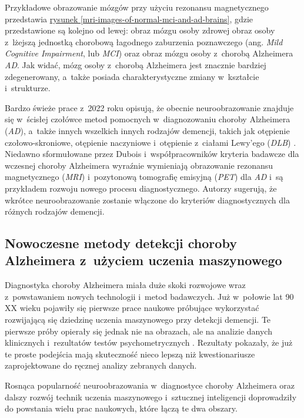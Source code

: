 Przykładowe obrazowanie mózgów przy użyciu rezonansu magnetycznego przedstawia \hyperref[mri-images-of-normal-mci-and-ad-brains]{rysunek \ref*{mri-images-of-normal-mci-and-ad-brains}}, gdzie przedstawione są kolejno od lewej: obraz mózgu osoby zdrowej obraz osoby z~lżejszą jednostką chorobową łagodnego zaburzenia poznawczego (ang. \emph{Mild Cognitive Impairment}, lub \emph{MCI}) oraz obraz mózgu osoby z~chorobą Alzheimera \emph{AD}.
Jak widać, mózg osoby z~chorobą Alzheimera jest znacznie bardziej zdegenerowany, a~także posiada charakterystyczne zmiany w~kształcie i~strukturze.

Bardzo świeże prace z~2022 roku opisują, że obecnie neuroobrazowanie znajduje się w~ścisłej czołówce metod pomocnych w~diagnozowaniu choroby Alzheimera (\emph{AD}), a~także innych wszelkich innych rodzajów demencji, takich jak otępienie czołowo-skroniowe, otępienie naczyniowe i~otępienie z~ciałami Lewy'ego (\emph{DLB}) \cite{scheltens2022imaging}.
Niedawno sformułowane przez Dubois i~współpracowników kryteria badawcze dla wczesnej choroby Alzheimera wyraźnie wymieniają obrazowanie rezonansu magnetycznego (\emph{MRI}) i~pozytonową tomografię emisyjną (\emph{PET}) dla \emph{AD} i~są przykładem rozwoju nowego procesu diagnostycznego.
Autorzy sugerują, że wkrótce neuroobrazowanie zostanie włączone do kryteriów diagnostycznych dla różnych rodzajów demencji.

\subsection{Nowoczesne metody detekcji choroby Alzheimera z~użyciem uczenia maszynowego}
\label{modern-detection-methods-for-alzheimers-using-machine-learning}

Diagnostyka choroby Alzheimera miała duże skoki rozwojowe wraz z~powstawaniem nowych technologii i~metod badawczych.
Już w~połowie lat 90 XX wieku pojawiły się pierwsze prace naukowe próbujące wykorzystać rozwijającą się dziedzinę uczenia maszynowego przy detekcji demencji.
Te pierwsze próby opierały się jednak nie na obrazach, ale na analizie danych klinicznych i~rezultatów testów psychometrycznych \cite{datta1996applying}.
Rezultaty pokazały, że już te proste podejścia mają skuteczność nieco lepszą niż kwestionariusze zaprojektowane do ręcznej analizy zebranych danych.

Rosnąca popularność neuroobrazowania w~diagnostyce choroby Alzheimera oraz dalszy rozwój technik uczenia maszynowego i~sztucznej inteligencji doprowadziły do powstania wielu prac naukowych, które łączą te dwa obszary.

